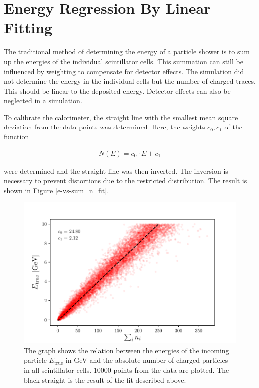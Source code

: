 \documentclass[12pt, a4paper]{thesis}
\begin{document}
\section{Energy Regression By Linear Fitting}
\label{sec:orgd10286d}

The traditional method of determining the energy of a particle shower is to sum
up the energies of the individual scintillator cells. This summation can still
be influenced by weighting to compensate for detector effects. The simulation
did not determine the energy in the individual cells but the number of charged
traces. This should be linear to the deposited energy. Detector effects can also
be neglected in a simulation.

To calibrate the calorimeter, the straight line with the smallest mean square
deviation from the data points was determined. Here, the weights \(c_0, c_1\) of the
function

\begin{align}
N(E) = c_0 \cdot E + c_1
\end{align}

were determined and the straight line was then inverted. The inversion
is necessary to prevent distortions due to the restricted
distribution. The result is shown in Figure \ref{e-vs-sum_n_fit}.

\label{e-vs-sum_n_fit}
\begin{figure}[htbp]
\centering
\includegraphics[width=.9\linewidth]{../images/e-vs-sum_n_fit.pdf}
\caption{\label{fig:org5ec07d9}
The graph shows the relation between the energies of the incoming particle \(E_{\text{true}}\) in GeV and the absolute number of charged particles in all scintillator cells.  10000 points from the data are plotted. The black straight is the result of the fit described above.}
\end{figure}
\end{document}
